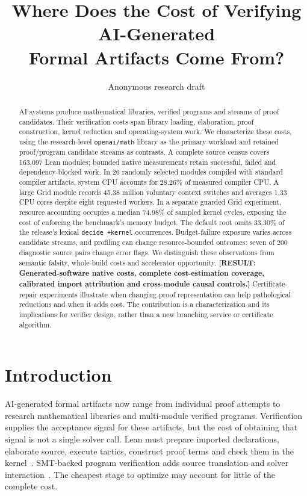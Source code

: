 \documentclass[10pt,twocolumn]{article}
\title{Where Does the Cost of Verifying AI-Generated\\Formal Artifacts Come From?}
\author{Anonymous research draft}
\date{}
\newcommand{\missing}[1]{\textbf{[RESULT: #1]}}
\begin{document}
\maketitle
\begin{abstract}
AI systems produce mathematical libraries, verified programs and streams of
proof candidates. Their verification costs span library loading, elaboration,
proof construction, kernel reduction and operating-system work.
We characterize these costs, using the research-level \texttt{openai/math}
library as the primary workload and retained proof/program candidate streams
as contrasts. A complete source census covers 163,097 Lean modules; bounded
native measurements retain successful, failed and dependency-blocked work.
In 26 randomly selected modules compiled with standard compiler artifacts,
system CPU accounts for 28.26\% of measured compiler CPU. A large Grid module
records 45.38 million voluntary context switches and averages 1.33 CPU cores
despite eight requested workers. In a separate guarded Grid experiment,
resource accounting occupies a median 74.98\% of sampled kernel cycles,
exposing the cost of enforcing the benchmark's memory budget.
The default root omits 33.30\% of the release's lexical
\texttt{decide +kernel} occurrences.
Budget-failure exposure varies across candidate streams, and profiling can
change resource-bounded outcomes: seven of 200 diagnostic source pairs change
error flags. We distinguish these observations from semantic falsity,
whole-build costs and accelerator opportunity.
\missing{Generated-software native costs, complete cost-estimation coverage,
calibrated import attribution and cross-module causal controls.}
Certificate-repair experiments illustrate when changing proof representation
can help pathological reductions and when it adds cost. The contribution is
a characterization and its implications for verifier design, rather than a
new branching service or certificate algorithm.
\end{abstract}

\section{Introduction}
AI-generated formal artifacts now range from individual proof attempts to
research mathematical libraries and multi-module verified programs.
Verification supplies the acceptance signal for these artifacts, but the
cost of obtaining that signal is not a single solver call.
Lean must prepare imported declarations, elaborate source, execute tactics,
construct proof terms and check them in the kernel~\cite{lean4}.
SMT-backed program verification adds source translation and solver
interaction~\cite{verus}. The cheapest stage to optimize may account for
little of the complete cost.
\end{document}
